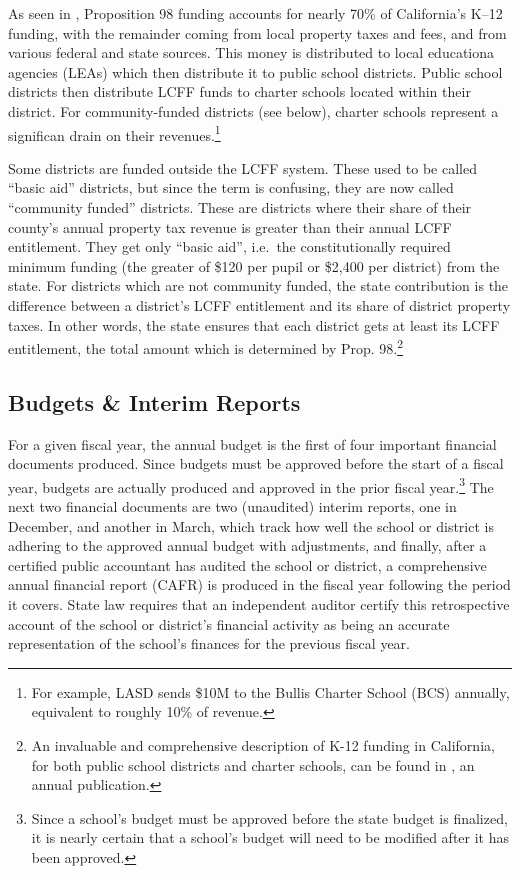 As seen in , Proposition 98 funding accounts for nearly 70\% of California's K–12 funding, with the remainder coming from local property taxes and fees, and from various federal and state sources. This money is distributed to local educationa agencies (LEAs) which then distribute it to public school districts. Public school districts then distribute LCFF funds to charter schools located within their district. For community-funded districts (see below), charter schools represent a significan drain on their revenues.\footnote{For example, LASD sends \$10M to the Bullis Charter School (BCS) annually, equivalent to roughly 10\% of revenue.}

Some districts are funded outside the LCFF system. These used to be called ``basic aid'' districts, but since the term is confusing, they are now called ``community funded'' districts. These are districts where their share of their county's annual property tax revenue is greater than their annual LCFF entitlement. They get only ``basic aid'', i.e.~the constitutionally required minimum funding (the greater of \$120 per pupil or \$2,400 per district) from the state. For districts which are not community funded, the state contribution is the difference between a district's LCFF entitlement and its share of district property taxes. In other words, the state ensures that each district gets at least its LCFF entitlement, the total amount which is determined by Prop. 98.\footnote{An invaluable and comprehensive description of K-12 funding in California, for both public school districts and charter schools, can be found in \textcite{Aguinaldo.etal2022}, an annual publication.}

\subsection{Budgets \& Interim Reports}\label{sec:budgets}\indent%

For a given fiscal year, the annual budget is the first of four important financial documents produced. Since budgets must be approved before the start of a fiscal year, budgets are actually produced and approved in the prior fiscal year.\footnote{Since a school's budget must be approved before the state budget is finalized, it is nearly certain that a school's budget will need to be modified after it has been approved.} The next two financial documents are two (unaudited) interim reports, one in December, and another in March, which track how well the school or district is adhering to the approved annual budget with adjustments, and finally, after a certified public accountant has audited the school or district, a comprehensive annual financial report (CAFR) is produced in the fiscal year following the period it covers. State law requires that an independent auditor certify this retrospective account of the school or district's financial activity as being an accurate representation of the school's finances for the previous fiscal year.

